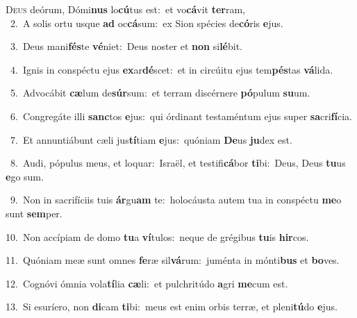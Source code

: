 \lettrine{\initial\textcolor{\initialcolor}{D}}{eus} deórum, Dómi\textbf{nus} lo\-\textbf{cú}\-tus est:~\star et vo\-\textbf{cá}\-vit \textbf{ter}\-ram,\\
{\numbfont\textcolor{\numbcolor}{~2.}}~A solis ortu usque \textbf{ad} oc\-\textbf{cá}\-sum:~\star ex Sion spécies de\-\textbf{có}\-ris \textbf{e}\-jus.\par
{\numbfont\textcolor{\numbcolor}{~3.}}~Deus mani\-\textbf{fés}\-te \textbf{vé}\-niet:~\star Deus noster et \textbf{non} si\-\textbf{lé}\-bit.\par
{\numbfont\textcolor{\numbcolor}{~4.}}~Ignis in conspéctu ejus \textbf{ex}\-ar\-\textbf{dé}\-scet:~\star et in circúitu ejus tem\-\textbf{pés}\-tas \textbf{vá}\-lida.\par
{\numbfont\textcolor{\numbcolor}{~5.}}~Advocábit \textbf{cæ}\-lum de\-\textbf{súr}\-sum:~\star et terram discérnere \textbf{pó}\-pulum \textbf{su}\-um.\par
{\numbfont\textcolor{\numbcolor}{~6.}}~Congregáte illi \textbf{sanc}\-tos \textbf{e}\-jus:~\star qui órdinant testaméntum ejus super \textbf{sa}\-cri\-\textbf{fí}\-cia.\par
{\numbfont\textcolor{\numbcolor}{~7.}}~Et annuntiábunt cæli jus\-\textbf{tí}\-tiam \textbf{e}\-jus:~\star quóniam \textbf{De}\-us \textbf{ju}\-dex est.\par
{\numbfont\textcolor{\numbcolor}{~8.}}~Audi, pópulus meus, et loquar:~\dagger Israël, et testifi\-\textbf{cá}\-bor \textbf{ti}\-bi:~\star Deus, Deus \textbf{tu}\-us \textbf{e}\-go sum.\par
{\numbfont\textcolor{\numbcolor}{~9.}}~Non in sacrifíciis tuis \textbf{ár}\-gu\textbf{am} te:~\star holocáusta autem tua in conspéctu \textbf{me}\-o sunt \textbf{sem}\-per.\par
{\numbfont\textcolor{\numbcolor}{10.}}~Non accípiam de domo \textbf{tu}\-a \textbf{ví}\-tulos:~\star neque de grégibus \textbf{tu}\-is \textbf{hir}\-cos.\par
{\numbfont\textcolor{\numbcolor}{11.}}~Quóniam meæ sunt omnes \textbf{fe}\-ræ sil\-\textbf{vá}\-rum:~\star juménta in mónti\textbf{bus} et \textbf{bo}\-ves.\par
{\numbfont\textcolor{\numbcolor}{12.}}~Cognóvi ómnia vola\-\textbf{tí}\-lia \textbf{cæ}\-li:~\star et pulchritúdo \textbf{a}\-gri \textbf{me}\-cum est.\par
{\numbfont\textcolor{\numbcolor}{13.}}~Si esuríero, non \textbf{di}\-cam \textbf{ti}\-bi:~\star meus est enim orbis terræ, et pleni\-\textbf{tú}\-do \textbf{e}\-jus.\par
